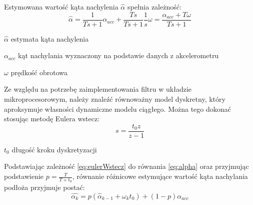 Estymowana wartość kąta nachylenia $\hat{\alpha}$ spełnia zależność:
\begin{equation}
    \hat{\alpha} = \frac{1}{Ts+1}\alpha_{acc}+\frac{Ts}{Ts+1}\frac{1}{s}\omega = \frac{\alpha_{acc}+T\omega}{Ts + 1}
    \label{eq:alpha}
\end{equation}
\begin{eqwhere}[2cm]
	\item[$\hat{\alpha}$] estymata kąta nachylenia
	\item[$\alpha_{acc}$] kąt nachylania wyznaczony na podstawie danych z akcelerometru
	\item[$\omega$] prędkość obrotowa
\end{eqwhere}

Ze względu na potrzebę zaimplementowania filtru w układzie mikroprocesorowym, należy znaleźć równoważny model dyskretny, który aproksymuje własności dynamiczne modelu ciągłego. Można tego dokonać stosując metodę Eulera wstecz\cite{grega}:
\begin{equation}
    s=\frac{t_0z}{z-1}
    \label{eq:eulerWstecz}
\end{equation}
\begin{eqwhere}[2cm]
	\item[$t_{0}$] długość kroku dyskretyzacji
\end{eqwhere}

Podstawiając zależność \ref{eq:eulerWstecz} do równania \ref{eq:alpha} oraz przyjmując podstawienie $p = \frac{T}{T + t_0}$,  równanie różnicowe estymujące wartość kąta nachylania podłoża przyjmuje postać:
\begin{equation}
    \hat{\alpha_{k}} = p(\hat{\alpha}_{k-1} + \omega_{k}t_0) + (1-p)\alpha_{acc}
\end{equation}

